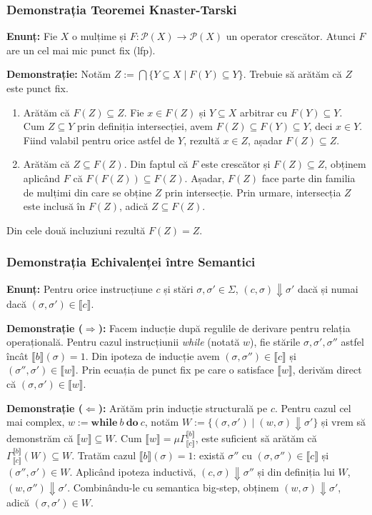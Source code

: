 \subsubsection{Demonstrația Teoremei Knaster-Tarski}
\textbf{Enunț:} Fie $X$ o mulțime și $F : \mathcal{P}(X) \to \mathcal{P}(X)$ un operator crescător. Atunci $F$ are un cel mai mic punct fix (lfp).

\textbf{Demonstrație:}
Notăm $Z := \bigcap \{ Y \subseteq X \mid F(Y) \subseteq Y \}$. Trebuie să arătăm că $Z$ este punct fix.
\begin{enumerate}
	\item Arătăm că $F(Z) \subseteq Z$. Fie $x \in F(Z)$ și $Y \subseteq X$ arbitrar cu $F(Y) \subseteq Y$. Cum $Z \subseteq Y$ prin definiția intersecției, avem $F(Z) \subseteq F(Y) \subseteq Y$, deci $x \in Y$. Fiind valabil pentru orice astfel de $Y$, rezultă $x \in Z$, așadar $F(Z) \subseteq Z$.
	\item Arătăm că $Z \subseteq F(Z)$. Din faptul că $F$ este crescător și $F(Z) \subseteq Z$, obținem aplicând $F$ că $F(F(Z)) \subseteq F(Z)$. Așadar, $F(Z)$ face parte din familia de mulțimi din care se obține $Z$ prin intersecție. Prin urmare, intersecția $Z$ este inclusă în $F(Z)$, adică $Z \subseteq F(Z)$.
\end{enumerate}
Din cele două incluziuni rezultă $F(Z) = Z$.

\subsubsection{Demonstrația Echivalenței între Semantici}
\textbf{Enunț:} Pentru orice instrucțiune $c$ și stări $\sigma, \sigma' \in \Sigma$, $(c, \sigma) \Downarrow \sigma'$ dacă și numai dacă $(\sigma, \sigma') \in \llbracket c \rrbracket$.

\textbf{Demonstrație ($\Rightarrow$):} Facem inducție după regulile de derivare pentru relația operațională. Pentru cazul instrucțiunii \textit{while} (notată $w$), fie stările $\sigma, \sigma', \sigma''$ astfel încât $\llbracket b \rrbracket(\sigma) = 1$. Din ipoteza de inducție avem $(\sigma, \sigma'') \in \llbracket c \rrbracket$ și $(\sigma'', \sigma') \in \llbracket w \rrbracket$. Prin ecuația de punct fix pe care o satisface $\llbracket w \rrbracket$, derivăm direct că $(\sigma, \sigma') \in \llbracket w \rrbracket$.

\textbf{Demonstrație ($\Leftarrow$):} Arătăm prin inducție structurală pe $c$. Pentru cazul cel mai complex, $w := \mathbf{while}\ b\ \mathbf{do}\ c$, notăm $W := \{ (\sigma, \sigma') \mid (w, \sigma) \Downarrow \sigma' \}$ și vrem să demonstrăm că $\llbracket w \rrbracket \subseteq W$. Cum $\llbracket w \rrbracket = \mu \Gamma_{\llbracket c \rrbracket}^{\llbracket b \rrbracket}$, este suficient să arătăm că $\Gamma_{\llbracket c \rrbracket}^{\llbracket b \rrbracket}(W) \subseteq W$. Tratăm cazul $\llbracket b \rrbracket(\sigma)=1$: există $\sigma''$ cu $(\sigma, \sigma'') \in \llbracket c \rrbracket$ și $(\sigma'', \sigma') \in W$. Aplicând ipoteza inductivă, $(c, \sigma) \Downarrow \sigma''$ și din definiția lui $W$, $(w, \sigma'') \Downarrow \sigma'$. Combinându-le cu semantica big-step, obținem $(w, \sigma) \Downarrow \sigma'$, adică $(\sigma, \sigma') \in W$.

